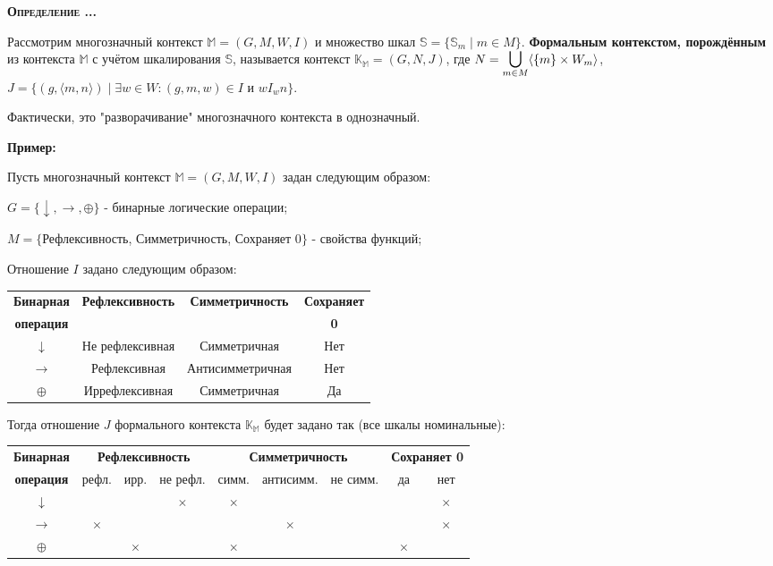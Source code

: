 \documentclass[18pt, a4paper]{extarticle}
\newcounter{par}
\newcounter{spar}
\newcounter{zap}
\newcommand{\opr}{\textbf{\textsc{Определение \thepar.\if\thespar1\thespar.\fi\thezap.\;}}\stepcounter{zap}}
\newcommand{\primer}{\textbf{Пример:\;}}
\newcommand{\bigs}[1]{\scalebox{1.3}{$#1$}}
\begin{document}
\opr

Рассмотрим многозначный контекст $\mathbb{M}=(G,M,W,I)$ и множество шкал $\mathbb{S}=\{\mathbb{S}_m\;|\;m\in M\}$. \textbf{Формальным контекстом, порождённым} из контекста $\mathbb{M}$ с учётом шкалирования $\mathbb{S}$, называется контекст $\mathbb{K}_{\mathbb{M}}=(G,N,J)$, где $N=\underset{m\in M}{\bigs\bigcup}\langle\{m\}\times W_m\rangle$,\\

$J=\{(g,\langle m,n\rangle)\;|\;\exists w\in W:(g,m,w)\in I\text{ и } wI_wn\}$.

Фактически, это "разворачивание"{} многозначного контекста в однозначный.

\primer

Пусть многозначный контекст $\mathbb{M}=(G,M,W,I)$ задан следующим образом:

$G=\{\downarrow,\to,\oplus\}$ - бинарные логические операции;

$M=\{$Рефлексивность, Симметричность, Сохраняет 0$\}$ - свойства функций;

Отношение $I$ задано следующим образом:

\begin{center}
\scalebox{.8}
{
\begin{tabular}{|c|c|c|c|}
\cline{1-4}
\textbf{Бинарная} & \textbf{Рефлексивность} & \textbf{Симметричность} & \textbf{Сохраняет} \\
\textbf{операция} & & & \textbf{0} \\
\cline{1-4}
\textbf{$\downarrow$} & Не рефлексивная & Симметричная & Нет \\
\cline{1-4}
\textbf{$\to$} & Рефлексивная & Антисимметричная & Нет \\
\cline{1-4}
\textbf{$\oplus$} & Иррефлексивная & Симметричная & Да \\
\cline{1-4}
\end{tabular}
}
\end{center}

Тогда отношение $J$ формального контекста $\mathbb{K}_{\mathbb{M}}$ будет задано так (все шкалы номинальные):

\begin{center}
\scalebox{.8}
{
\begin{tabular}{|c||c|c|c||c|c|c||c|c|}
\cline{1-9}
\textbf{Бинарная} & \multicolumn{3}{c||}{\textbf{Рефлексивность}} & \multicolumn{3}{c||}{\textbf{Симметричность}} & \multicolumn{2}{c|}{\textbf{Сохраняет 0}} \\
\cline{2-9}
\textbf{операция} & рефл. & ирр. & не рефл. & симм. & антисимм. & не симм. & да & нет \\
\cline{1-9}
\textbf{$\downarrow$} & & & $\times$ & $\times$ & & & & $\times$ \\
\cline{1-9}
\textbf{$\to$} & $\times$ & & & & $\times$ & & & $\times$ \\
\cline{1-9}
\textbf{$\oplus$} & & $\times$ & & $\times$ & & & $\times$ & \\
\cline{1-9}
\end{tabular}
}
\end{center}
\end{document}
